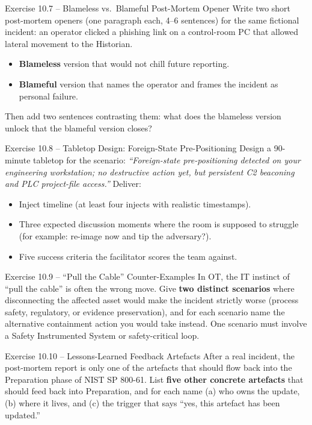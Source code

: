 \documentclass[11pt,a4paper]{article}
\begin{document}
\begin{taskbox}{Exercise 10.7 -- Blameless vs.\ Blameful Post-Mortem Opener}
Write two short post-mortem openers (one paragraph each, 4--6 sentences) for the
same fictional incident: an operator clicked a phishing link on a control-room
PC that allowed lateral movement to the Historian.
\begin{itemize}\setlength{\itemsep}{1pt}
  \item \textbf{Blameless} version that would not chill future reporting.
  \item \textbf{Blameful} version that names the operator and frames the
        incident as personal failure.
\end{itemize}
Then add two sentences contrasting them: what does the blameless version unlock
that the blameful version closes?
\end{taskbox}

\begin{taskbox}{Exercise 10.8 -- Tabletop Design: Foreign-State Pre-Positioning}
Design a 90-minute tabletop for the scenario: \emph{``Foreign-state
pre-positioning detected on your engineering workstation; no destructive
action yet, but persistent C2 beaconing and PLC project-file access.''}
Deliver:
\begin{itemize}\setlength{\itemsep}{1pt}
  \item Inject timeline (at least four injects with realistic timestamps).
  \item Three expected discussion moments where the room is supposed to
        struggle (for example: re-image now and tip the adversary?).
  \item Five success criteria the facilitator scores the team against.
\end{itemize}
\end{taskbox}

\begin{taskbox}{Exercise 10.9 -- ``Pull the Cable'' Counter-Examples}
In OT, the IT instinct of ``pull the cable'' is often the wrong move. Give
\textbf{two distinct scenarios} where disconnecting the affected asset would
make the incident strictly worse (process safety, regulatory, or evidence
preservation), and for each scenario name the alternative containment action
you would take instead. One scenario must involve a Safety Instrumented System
or safety-critical loop.
\end{taskbox}

\begin{taskbox}{Exercise 10.10 -- Lessons-Learned Feedback Artefacts}
After a real incident, the post-mortem report is only one of the artefacts that
should flow back into the Preparation phase of NIST SP 800-61. List
\textbf{five other concrete artefacts} that should feed back into Preparation,
and for each name (a) who owns the update, (b) where it lives, and (c) the
trigger that says ``yes, this artefact has been updated.''
\end{taskbox}
\end{document}
